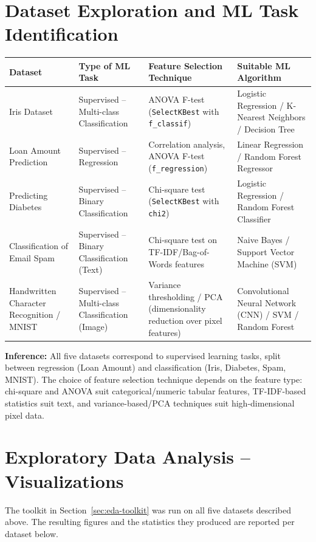 \documentclass[12pt,a4paper]{article}
\begin{document}
\section{Dataset Exploration and ML Task Identification}

\begin{longtable}{|p{3.3cm}|p{2.6cm}|p{3.6cm}|p{4.7cm}|}
\hline
\textbf{Dataset} & \textbf{Type of ML Task} & \textbf{Feature Selection Technique} & \textbf{Suitable ML Algorithm} \\ \hline
\endhead
Iris Dataset & Supervised -- Multi-class Classification & ANOVA F-test (\texttt{SelectKBest} with \texttt{f\_classif}) & Logistic Regression / K-Nearest Neighbors / Decision Tree \\ \hline
Loan Amount Prediction & Supervised -- Regression & Correlation analysis, ANOVA F-test (\texttt{f\_regression}) & Linear Regression / Random Forest Regressor \\ \hline
Predicting Diabetes & Supervised -- Binary Classification & Chi-square test (\texttt{SelectKBest} with \texttt{chi2}) & Logistic Regression / Random Forest Classifier \\ \hline
Classification of Email Spam & Supervised -- Binary Classification (Text) & Chi-square test on TF-IDF/Bag-of-Words features & Naive Bayes / Support Vector Machine (SVM) \\ \hline
Handwritten Character Recognition / MNIST & Supervised -- Multi-class Classification (Image) & Variance thresholding / PCA (dimensionality reduction over pixel features) & Convolutional Neural Network (CNN) / SVM / Random Forest \\ \hline
\end{longtable}

\textbf{Inference:} All five datasets correspond to supervised learning tasks, split between
regression (Loan Amount) and classification (Iris, Diabetes, Spam, MNIST). The choice of
feature selection technique depends on the feature type: chi-square and ANOVA suit
categorical/numeric tabular features, TF-IDF-based statistics suit text, and
variance-based/PCA techniques suit high-dimensional pixel data.

\section{Exploratory Data Analysis -- Visualizations}
The toolkit in Section~\ref{sec:eda-toolkit} was run on all five datasets described above.
The resulting figures and the statistics they produced are reported per dataset below.
\end{document}
